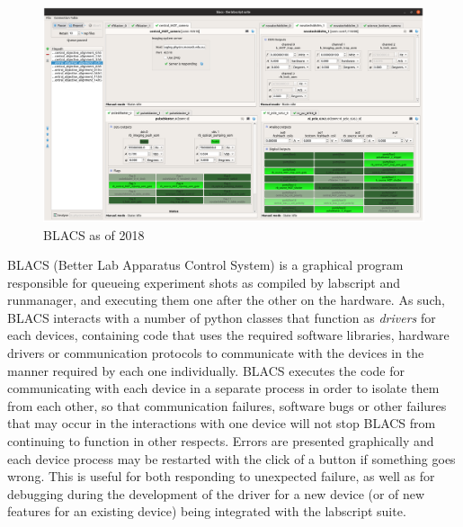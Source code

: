 \begin{figure}
\begin{center}
\includegraphics[width=\textwidth]{figures/software/new_screenshots/blacs.png}
\caption{BLACS as of 2018}\label{fig:blacs}
\end{center}
\end{figure}

BLACS (Better Lab Apparatus Control System) is a graphical program responsible for queueing experiment shots as compiled by labscript and runmanager, and executing them one after the other on the hardware. As such, BLACS interacts with a number of python classes that function as \emph{drivers} for each devices, containing code that uses the required software libraries, hardware drivers or communication protocols to communicate with the devices in the manner required by each one individually. BLACS executes the code for communicating with each device in a separate process in order to isolate them from each other, so that communication failures, software bugs or other failures that may occur in the interactions with one device will not stop BLACS from continuing to function in other respects. Errors are presented graphically and each device process may be restarted with the click of a button if something goes wrong. This is useful for both responding to unexpected failure, as well as for debugging during the development of the driver for a new device (or of new features for an existing device) being integrated with the labscript suite.

